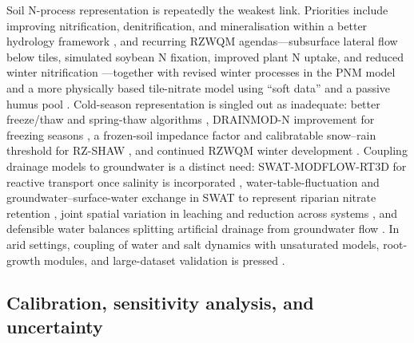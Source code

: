 Soil N-process representation is repeatedly the weakest link. Priorities include
improving nitrification, denitrification, and mineralisation within a better
hydrology framework \parencite{Smith2020,Fang2012,Hu2007}, and recurring RZWQM
agendas---subsurface lateral flow below tiles, simulated soybean N fixation,
improved plant N uptake, and reduced winter nitrification
\parencite{Ma2007,Ma2008,Ma2001,Bakhsh2004}---together with revised winter
processes in the PNM model \parencite{Marjerison2016} and a more physically based
tile-nitrate model using ``soft data'' and a passive humus pool
\parencite{Qi2025}. Cold-season representation is singled out as inadequate:
better freeze/thaw and spring-thaw algorithms \parencite{Feyereisen2006b},
DRAINMOD-N improvement for freezing seasons \parencite{Yang2007,Saadat2020,Jiang2020},
a frozen-soil impedance factor and calibratable snow--rain threshold for RZ-SHAW
\parencite{Li2024b}, and continued RZWQM winter development
\parencite{Ahmed2007b,Motarjemi2021}. Coupling drainage models to groundwater is
a distinct need: SWAT-MODFLOW-RT3D for reactive transport once salinity is
incorporated \parencite{Addab2022}, water-table-fluctuation and
groundwater--surface-water exchange in SWAT to represent riparian nitrate
retention \parencite{Hoang2017}, joint spatial variation in leaching and
reduction across systems \parencite{Hojberg2017}, and defensible water balances
splitting artificial drainage from groundwater flow
\parencite{Barkle2021,Elsayed2023,Yang2008}. In arid settings, coupling of water
and salt dynamics with unsaturated models, root-growth modules, and
large-dataset validation is pressed
\parencite{Ebrahimian2015,Sarangi2006,Han2025,Liu2022,Guo2025}.

\subsection{Calibration, sensitivity analysis, and uncertainty}

